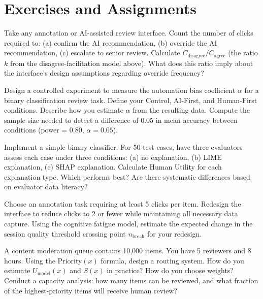\section{Exercises and Assignments}

\begin{Exercise}
Take any annotation or AI-assisted review interface. Count the number of clicks required to: (a) confirm the AI recommendation, (b) override the AI recommendation, (c) escalate to senior review. Calculate $C_{\text{disagree}} / C_{\text{agree}}$ (the ratio $k$ from the disagree-facilitation model above). What does this ratio imply about the interface's design assumptions regarding override frequency?
\end{Exercise}

\begin{Exercise}
Design a controlled experiment to measure the automation bias coefficient $\alpha$ for a binary classification review task. Define your Control, AI-First, and Human-First conditions. Describe how you estimate $\alpha$ from the resulting data. Compute the sample size needed to detect a difference of 0.05 in mean accuracy between conditions (power = 0.80, $\alpha = 0.05$).
\end{Exercise}

\begin{Exercise}
Implement a simple binary classifier. For 50 test cases, have three evaluators assess each case under three conditions: (a) no explanation, (b) LIME explanation, (c) SHAP explanation. Calculate Human Utility for each explanation type. Which performs best? Are there systematic differences based on evaluator data literacy?
\end{Exercise}

\begin{Exercise}
Choose an annotation task requiring at least 5 clicks per item. Redesign the interface to reduce clicks to 2 or fewer while maintaining all necessary data capture. Using the cognitive fatigue model, estimate the expected change in the session quality threshold crossing point $n_{\text{break}}$ for your redesign.
\end{Exercise}

\begin{Exercise}
A content moderation queue contains 10,000 items. You have 5 reviewers and 8 hours. Using the Priority$(x)$ formula, design a routing system. How do you estimate $U_{\text{model}}(x)$ and $S(x)$ in practice? How do you choose weights? Conduct a capacity analysis: how many items can be reviewed, and what fraction of the highest-priority items will receive human review?
\end{Exercise}

